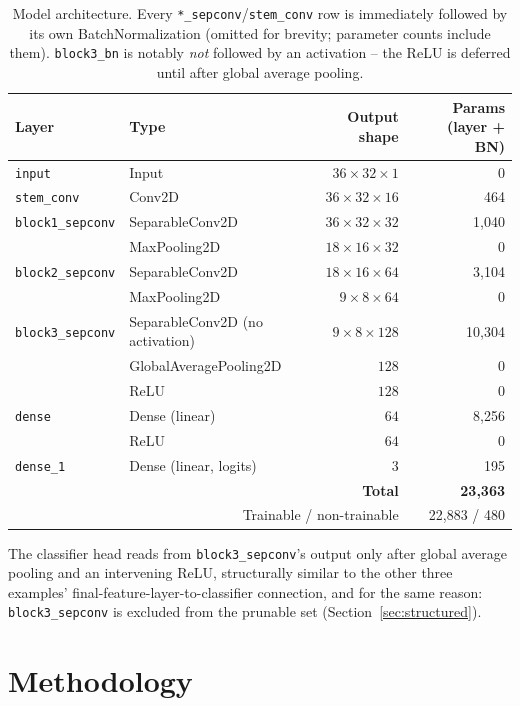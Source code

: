 \documentclass[11pt]{article}
\newcommand{\code}[1]{\texttt{#1}}
\begin{document}
\begin{table}[H]
\centering
\caption{Model architecture. Every \code{*\_sepconv}/\code{stem\_conv} row is immediately followed by its own BatchNormalization (omitted for brevity; parameter counts include them). \code{block3\_bn} is notably \emph{not} followed by an activation -- the ReLU is deferred until after global average pooling.}
\label{tab:arch}
\begin{tabular}{@{}llrr@{}}
\toprule
Layer & Type & Output shape & Params (layer + BN) \\
\midrule
\code{input} & Input & $36\times32\times1$ & 0 \\
\code{stem\_conv} & Conv2D & $36\times32\times16$ & 464 \\
\code{block1\_sepconv} & SeparableConv2D & $36\times32\times32$ & 1{,}040 \\
& MaxPooling2D & $18\times16\times32$ & 0 \\
\code{block2\_sepconv} & SeparableConv2D & $18\times16\times64$ & 3{,}104 \\
& MaxPooling2D & $9\times8\times64$ & 0 \\
\code{block3\_sepconv} & SeparableConv2D (no activation) & $9\times8\times128$ & 10{,}304 \\
& GlobalAveragePooling2D & $128$ & 0 \\
& ReLU & $128$ & 0 \\
\code{dense} & Dense (linear) & $64$ & 8{,}256 \\
& ReLU & $64$ & 0 \\
\code{dense\_1} & Dense (linear, logits) & $3$ & 195 \\
\midrule
\multicolumn{3}{r}{\textbf{Total}} & \textbf{23{,}363} \\
\multicolumn{3}{r}{Trainable / non-trainable} & 22{,}883 / 480 \\
\bottomrule
\end{tabular}
\end{table}

The classifier head reads from \code{block3\_sepconv}'s output only after global average pooling and an intervening ReLU, structurally similar to the other three examples' final-feature-layer-to-classifier connection, and for the same reason: \code{block3\_sepconv} is excluded from the prunable set (Section~\ref{sec:structured}).

\section{Methodology}
\end{document}
